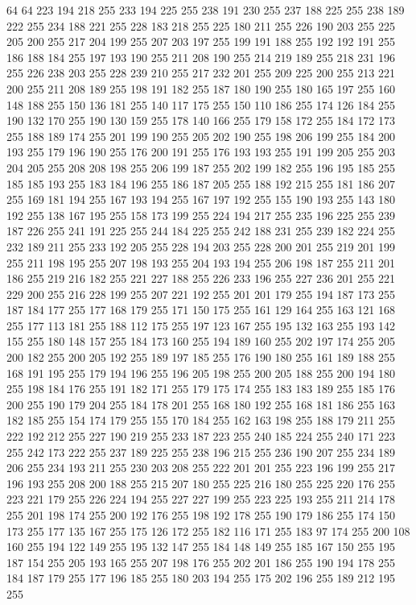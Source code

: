 64 64 223 194 218 255 233 194 225 255 238 191 230 255 237 188 225 255 238 189 222 255 234 188 221 255 228 183 218 255 225 180 211 255 226 190 203 255 225 205 200 255 217 204 199 255 207 203 197 255 199 191 188 255 192 192 191 255 186 188 184 255 197 193 190 255
211 208 190 255 214 219 189 255 218 231 196 255 226 238 203 255 228 239 210 255 217 232 201 255 209 225 200 255 213 221 200 255 211 208 189 255 198 191 182 255 187 180 190 255 180 165 197 255 160 148 188 255 150 136 181 255 140 117 175 255 150 110 186 255
174 126 184 255 190 132 170 255 190 130 159 255 178 140 166 255 179 158 172 255 184 172 173 255 188 189 174 255 201 199 190 255 205 202 190 255 198 206 199 255 184 200 193 255 179 196 190 255 176 200 191 255 176 193 193 255 191 199 205 255 203 204 205 255
208 208 198 255 206 199 187 255 202 199 182 255 196 195 185 255 185 185 193 255 183 184 196 255 186 187 205 255 188 192 215 255 181 186 207 255 169 181 194 255 167 193 194 255 167 197 192 255 155 190 193 255 143 180 192 255 138 167 195 255 158 173 199 255
224 194 217 255 235 196 225 255 239 187 226 255 241 191 225 255 244 184 225 255 242 188 231 255 239 182 224 255 232 189 211 255 233 192 205 255 228 194 203 255 228 200 201 255 219 201 199 255 211 198 195 255 207 198 193 255 204 193 194 255 206 198 187 255
211 201 186 255 219 216 182 255 221 227 188 255 226 233 196 255 227 236 201 255 221 229 200 255 216 228 199 255 207 221 192 255 201 201 179 255 194 187 173 255 187 184 177 255 177 168 179 255 171 150 175 255 161 129 164 255 163 121 168 255 177 113 181 255
188 112 175 255 197 123 167 255 195 132 163 255 193 142 155 255 180 148 157 255 184 173 160 255 194 189 160 255 202 197 174 255 205 200 182 255 200 205 192 255 189 197 185 255 176 190 180 255 161 189 188 255 168 191 195 255 179 194 196 255 196 205 198 255
200 205 188 255 200 194 180 255 198 184 176 255 191 182 171 255 179 175 174 255 183 183 189 255 185 176 200 255 190 179 204 255 184 178 201 255 168 180 192 255 168 181 186 255 163 182 185 255 154 174 179 255 155 170 184 255 162 163 198 255 188 179 211 255
222 192 212 255 227 190 219 255 233 187 223 255 240 185 224 255 240 171 223 255 242 173 222 255 237 189 225 255 238 196 215 255 236 190 207 255 234 189 206 255 234 193 211 255 230 203 208 255 222 201 201 255 223 196 199 255 217 196 193 255 208 200 188 255
215 207 180 255 225 216 180 255 225 220 176 255 223 221 179 255 226 224 194 255 227 227 199 255 223 225 193 255 211 214 178 255 201 198 174 255 200 192 176 255 198 192 178 255 190 179 186 255 174 150 173 255 177 135 167 255 175 126 172 255 182 116 171 255
183 97 174 255 200 108 160 255 194 122 149 255 195 132 147 255 184 148 149 255 185 167 150 255 195 187 154 255 205 193 165 255 207 198 176 255 202 201 186 255 190 194 178 255 184 187 179 255 177 196 185 255 180 203 194 255 175 202 196 255 189 212 195 255
